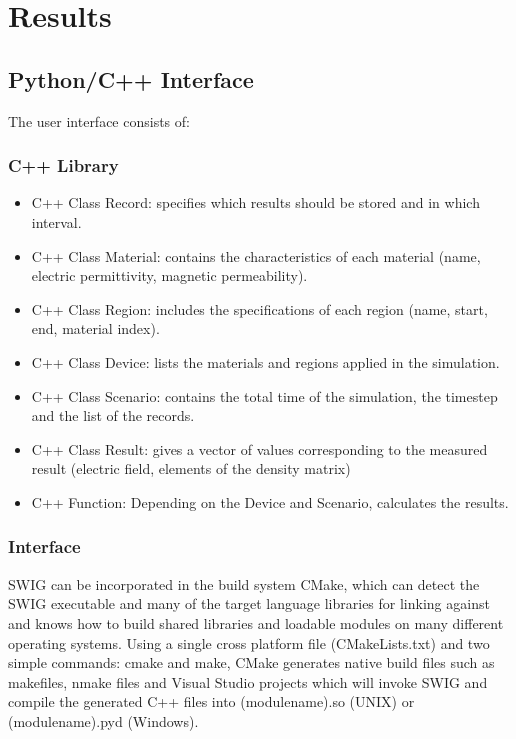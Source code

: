 \chapter{Results}
\label{chapter:results}
\section{Python/C++ Interface}
The user interface consists of:
\subsection{C++ Library} 
\begin{itemize}
\item C++ Class Record: specifies which results should be stored and in which interval.
\item C++ Class Material: contains the characteristics of each material (name, electric permittivity, magnetic permeability).
\item C++ Class Region: includes the specifications of each region (name, start, end, material index).
\item C++ Class Device: lists the materials and regions applied in the simulation.
\item C++ Class Scenario: contains the total time of the simulation, the timestep and the list of the records.
\item C++ Class Result: gives a vector of values corresponding to the measured result (electric field, elements of the density matrix)
\item C++ Function: Depending on the Device and Scenario, calculates the results.
\end{itemize}

\subsection{Interface}
SWIG can be incorporated in the build system CMake, which can detect the SWIG executable and many of the target language libraries for linking against and knows how to build shared libraries and loadable modules on many different operating systems. Using a single cross platform file (CMakeLists.txt) and two simple commands: cmake and make, CMake generates native build files such as makefiles, nmake files and Visual Studio projects which will invoke SWIG and compile the generated C++ files into  \textunderscore(module\textunderscore name).so (UNIX) or  \textunderscore(module\textunderscore name).pyd (Windows).

